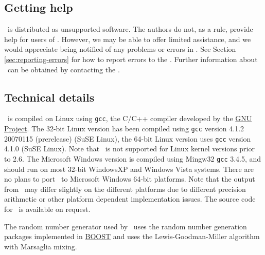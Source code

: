 \subsection{Getting help}

\SPM\ is distributed as unsupported software. The authors do not, as a rule, provide help for users of \SPM. However, we may be able to offer limited assistance, and we would appreciate being notified of any problems or errors in \SPM. See Section \ref{sec:reporting-errors} for how to report errors to the \authors. Further information about \SPM\ can be obtained by contacting the \authors.

\subsection{Technical details}

\SPM\ is compiled on Linux using \texttt{gcc}, the C/C++ compiler developed by the \href{http://gcc.gnu.org}{GNU Project}. The 32-bit Linux version has been compiled using \texttt{gcc} version 4.1.2 20070115 (prerelease) (SuSE Linux), the 64-bit Linux version uses \texttt{gcc} version 4.1.0 (SuSE Linux). Note that \SPM\ is not supported for Linux kernel versions prior to 2.6. The Microsoft Windows version is compiled using Mingw32 \texttt{gcc} 3.4.5, and should run on most 32-bit WindowsXP and Windows Vista systems. There are no plans to port \SPM\ to Microsoft Windows 64-bit platforms. Note that the output from \SPM\ may differ slightly on the different platforms due to different precision arithmetic or other platform dependent implementation issues. The source code for \SPM\ is available on request.

The random number generator used by \SPM\ uses the random number generation packages implemented in \href{http://www.boost.org/}{BOOST} and uses the Lewis-Goodman-Miller algorithm with Marsaglia mixing.
